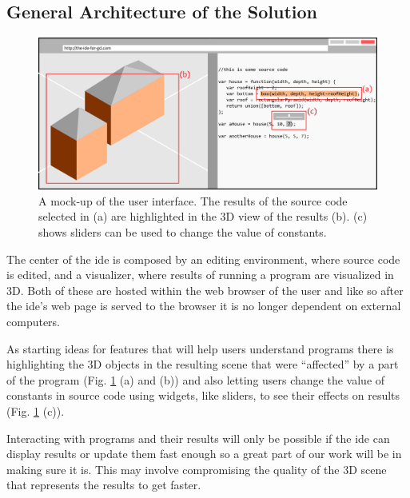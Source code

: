 \documentclass{./llncs2e/llncs}
\begin{document}

\subsection{General Architecture of the Solution}
	
	\begin{figure}
		\centering
		\includegraphics[width=1.0\textwidth]{img/ui_mock}
		\caption{A mock-up of the user interface. The results of the source code selected in (a) are highlighted in the 3D view of the results (b). (c) shows sliders can be used to change the value of constants.}
		\label{fig:ui:mock}
	\end{figure}
	
	The center of the \ac{ide} is composed by an editing environment, where source code is edited, and a visualizer, where results of running a program are visualized in 3D.
	Both of these are hosted within the web browser of the user and like so after the \ac{ide}'s web page is served to the browser it is no longer dependent on external computers.
	
	As starting ideas for features that will help users understand programs there is highlighting the 3D objects in the resulting scene that were ``affected'' by a part of the program (Fig. \ref{fig:ui:mock} (a) and (b)) and also letting users change the value of constants in source code using widgets, like sliders, to see their effects on results (Fig. \ref{fig:ui:mock} (c)).
	
	Interacting with programs and their results will only be possible if the \ac{ide} can display results or update them fast enough so a great part of our work will be in making sure it is.
	This may involve compromising the quality of the 3D scene that represents the results to get faster.
	
\end{document}
